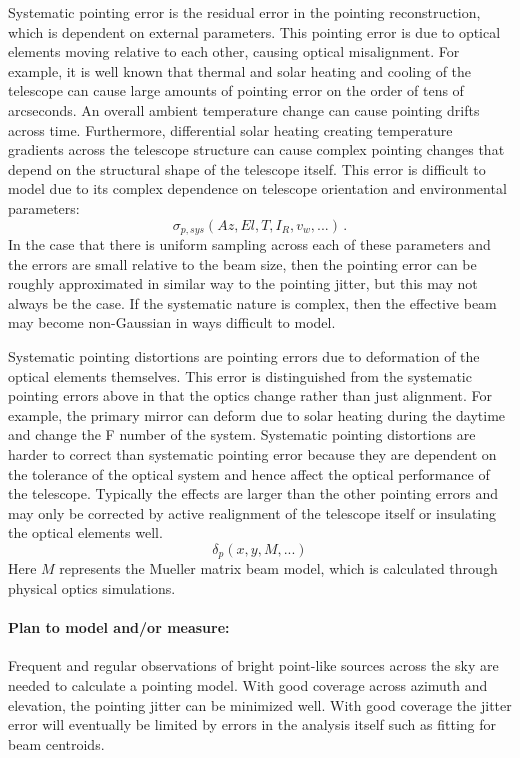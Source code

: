 Systematic pointing error is the residual error in the pointing reconstruction, which is dependent on external parameters. This pointing error is due to optical elements moving relative to each other, causing optical misalignment. For example, it is well known that thermal and solar heating and cooling of the telescope can cause large amounts of pointing error on the order of tens of arcseconds. An overall ambient temperature change can cause pointing drifts across time. Furthermore, differential solar heating creating temperature gradients across the telescope structure can cause complex pointing changes that depend on the structural shape of the telescope itself. This error is difficult to model due to its complex dependence on telescope orientation and environmental parameters:
\begin{equation}
\sigma_{p,sys} \left ( Az, El, T, I_{R}, v_{w}, ... \right ) \, .
\end{equation}
In the case that there is uniform sampling across each of these parameters and the errors are small relative to the beam size, then the pointing error can be roughly approximated in similar way to the pointing jitter, but this may not always be the case. If the systematic nature is complex, then the effective beam may become non-Gaussian in ways difficult to model.

Systematic pointing distortions are pointing errors due to deformation of the optical elements themselves. This error is distinguished from the systematic pointing errors above in that the optics change rather than just alignment. For example, the primary mirror can deform due to solar heating during the daytime and change the F number of the system. Systematic pointing distortions are harder to correct than systematic pointing error because they are dependent on the tolerance of the optical system and hence affect the optical performance of the telescope. Typically the effects are larger than the other pointing errors and may only be corrected by active realignment of the telescope itself or insulating the optical elements well.
\begin{equation}
\delta_{p} \left ( x, y, M, ... \right )
\end{equation}
Here $M$ represents the Mueller matrix beam model, which is calculated through physical optics simulations. 

\paragraph{Plan to model and/or measure:}
Frequent and regular observations of bright point-like sources across the sky are needed to calculate a pointing model. With good coverage across azimuth and elevation, the pointing jitter can be minimized well. With good coverage the jitter error will eventually be limited by errors in the analysis itself such as fitting for beam centroids.

